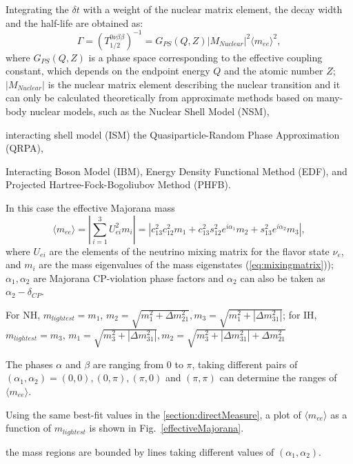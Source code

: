 Integrating the $\delta t$ with a weight of the nuclear matrix element, the decay width and the half-life are obtained as\cite{suekane2015neutrino,zuber2020neutrino}:
\begin{equation}
\Gamma=(T^{0\nu\beta\beta}_{1/2})^{-1} = G_{PS}(Q,Z)|M_{Nuclear}|^2\langle m_{ee}\rangle^2, 
\end{equation}
where $G_{PS}(Q,Z)$ is a phase space corresponding to the effective coupling constant, which depends on the endpoint energy $Q$ and the atomic number $Z$; $|M_{Nuclear}|$ is the nuclear matrix element describing the nuclear transition and it can only be calculated theoretically from approximate methods based on many-body nuclear models, such as the Nuclear Shell Model (NSM),


 interacting shell model (ISM)
 the Quasiparticle-Random Phase Approximation (QRPA), 

Interacting Boson Model (IBM), Energy Density Functional Method (EDF), and Projected Hartree-Fock-Bogoliubov Method (PHFB).

In this case the effective Majorana mass 
\begin{equation}
\langle m_{ee}\rangle = |\sum_{i=1}^3 U^2_{ei}m_i|= |c^2_{13}c^2_{12}m_1+c^2_{13}s^2_{12}e^{i\alpha_1}m_2+s^2_{13}e^{i\alpha_2}m_3|,
\end{equation}
where $U_{ei}$ are the elements of the neutrino mixing matrix for the flavor state $\nu_e$, and $m_i$ are the mass eigenvalues of the mass eigenstates (\ref{eq:mixingmatrix}));
$\alpha_1,\alpha_2$ are Majorana CP-violation phase factors and $\alpha_2$ can also be taken as $\alpha_2-\delta_{CP}$.

For NH, $m_{lightest}=m_1$,
$m_2=\sqrt{m_1^2+\Delta m^2_{21}}, m_3 = \sqrt{m_1^2+|\Delta m^2_{31}|}$;
for IH, $m_{lightest}=m_3$,
$m_1=\sqrt{m_3^2+|\Delta m^2_{31}|}, m_2=\sqrt{m_3^2+|\Delta m^2_{31}|+\Delta m^2_{21}}$

The phases $\alpha$ and $\beta$ are ranging from 0 to $\pi$, taking different pairs of $(\alpha_1,\alpha_2)=(0,0),(0,\pi), (\pi, 0)$ and $(\pi,\pi)$ can determine the ranges of $\langle m_{ee} \rangle$.


Using the same best-fit values in the \ref{section:directMeasure}, a plot of $\langle m_{ee}\rangle$
as a function of $m_{lightest}$ is shown in Fig.~\ref{effectiveMajorana}. 


the mass regions are bounded by lines taking different values of $(\alpha_1,\alpha_2)$.


